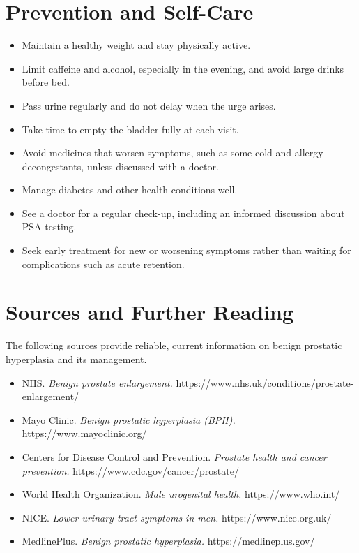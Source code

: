 \section*{Prevention and Self-Care}
\begin{itemize}
    \item Maintain a healthy weight and stay physically active.
    \item Limit caffeine and alcohol, especially in the evening, and avoid large drinks before bed.
    \item Pass urine regularly and do not delay when the urge arises.
    \item Take time to empty the bladder fully at each visit.
    \item Avoid medicines that worsen symptoms, such as some cold and allergy decongestants, unless discussed with a doctor.
    \item Manage diabetes and other health conditions well.
    \item See a doctor for a regular check-up, including an informed discussion about PSA testing.
    \item Seek early treatment for new or worsening symptoms rather than waiting for complications such as acute retention.
\end{itemize}

\section*{Sources and Further Reading}
The following sources provide reliable, current information on benign prostatic hyperplasia and its management.
\begin{itemize}
    \item NHS. \textit{Benign prostate enlargement.} https://www.nhs.uk/conditions/prostate-enlargement/
    \item Mayo Clinic. \textit{Benign prostatic hyperplasia (BPH).} https://www.mayoclinic.org/
    \item Centers for Disease Control and Prevention. \textit{Prostate health and cancer prevention.} https://www.cdc.gov/cancer/prostate/
    \item World Health Organization. \textit{Male urogenital health.} https://www.who.int/
    \item NICE. \textit{Lower urinary tract symptoms in men.} https://www.nice.org.uk/
    \item MedlinePlus. \textit{Benign prostatic hyperplasia.} https://medlineplus.gov/
\end{itemize}

